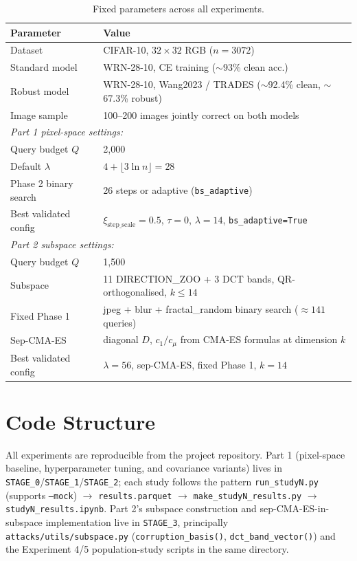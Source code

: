 \documentclass[11pt, a4paper]{article}
\begin{document}
\begin{table}[htbp]
\centering
\caption{Fixed parameters across all experiments.}
\begin{tabular}{ll}
\toprule
Parameter & Value \\
\midrule
Dataset & CIFAR-10, $32 \times 32$ RGB ($n = 3072$) \\
Standard model & WRN-28-10, CE training ($\sim$93\% clean acc.) \\
Robust model   & WRN-28-10, Wang2023 / TRADES ($\sim$92.4\% clean, $\sim$67.3\% robust) \\
Image sample   & 100--200 images jointly correct on both models \\
\midrule
\multicolumn{2}{l}{\textit{Part 1 pixel-space settings:}} \\
Query budget $Q$ & 2{,}000 \\
Default $\lambda$ & $4 + \lfloor 3\ln n \rfloor = 28$ \\
Phase 2 binary search & 26 steps or adaptive (\texttt{bs\_adaptive}) \\
Best validated config & $\xi_{\text{step\_scale}}=0.5$, $\tau=0$, $\lambda=14$, \texttt{bs\_adaptive=True} \\
\midrule
\multicolumn{2}{l}{\textit{Part 2 subspace settings:}} \\
Query budget $Q$ & 1{,}500 \\
Subspace & 11 DIRECTION\_ZOO + 3 DCT bands, QR-orthogonalised, $k\leq14$ \\
Fixed Phase 1 & jpeg + blur + fractal\_random binary search ($\approx141$ queries) \\
Sep-CMA-ES & diagonal $D$, $c_1/c_\mu$ from CMA-ES formulas at dimension $k$ \\
Best validated config & $\lambda=56$, sep-CMA-ES, fixed Phase 1, $k=14$ \\
\bottomrule
\end{tabular}
\end{table}

\section{Code Structure}

All experiments are reproducible from the project repository. Part 1 (pixel-space baseline, hyperparameter tuning, and covariance variants) lives in \texttt{STAGE\_0}/\texttt{STAGE\_1}/\texttt{STAGE\_2}; each study follows the pattern \texttt{run\_studyN.py} (supports \texttt{--mock}) $\to$ \texttt{results.parquet} $\to$ \texttt{make\_studyN\_results.py} $\to$ \texttt{studyN\_results.ipynb}. Part 2's subspace construction and sep-CMA-ES-in-subspace implementation live in \texttt{STAGE\_3}, principally \texttt{attacks/utils/subspace.py} (\texttt{corruption\_basis()}, \texttt{dct\_band\_vector()}) and the Experiment 4/5 population-study scripts in the same directory.
\end{document}
